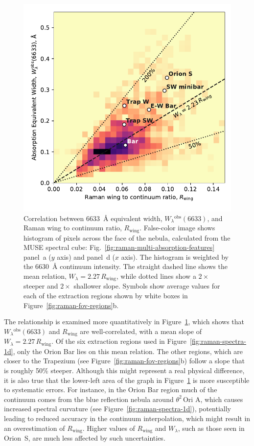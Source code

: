 \documentclass[useAMS, usenatbib, a4paper]{mnras}
\def\th#1#2{\ensuremath{\theta^{#1}\,\text{Ori~#2}}}
\newcommand\wing{\ensuremath{_{\text{wing}}}}
\newcommand\observed{\ensuremath{^{\text{obs}}}}
\begin{document}
\begin{figure}
  \centering
  \includegraphics[width=\linewidth]{figs/correlation-6633-Rwing}
  \caption{
    Correlation between \SI{6633}{\angstrom} equivalent width,
    \(W_\lambda\observed(6633)\), and Raman wing to continuum ratio, \(R\wing\).
    False-color image shows histogram of pixels across the face of the nebula,
    calculated from the MUSE spectral cube: 
    Fig.~\ref{fig:raman-multi-absorption-features} panel~a (\(y\) axis)
    and panel~d (\(x\) axis).
    The histogram is  weighted by the \SI{6630}{\angstrom}
    continuum intensity.
    The straight dashed line shows the mean relation,
    \(W_\lambda = 2.27\, R\wing\),
    while dotted lines show a \(2 \times\) steeper and \(2 \times\) shallower slope.
    Symbols show average values for each of the extraction regions
    shown by white boxes in Figure~\ref{fig:raman-fov-regions}b.
  }
  \label{fig:6633-Rwing}
\end{figure}

The relationship is examined more quantitatively in Figure~\ref{fig:6633-Rwing},
which shows that \(W_\lambda\observed (6633)\) and \(R\wing\) are well-correlated,
with a mean slope of \(W_\lambda = 2.27\, R\wing\).
Of the six extraction regions used in Figure~\ref{fig:raman-spectra-1d},
only the Orion Bar lies on this mean relation.
The other regions, which are closer to the Trapezium
(see Figure~\ref{fig:raman-fov-regions}b)
follow a slope that is roughly 50\% steeper.
Although this might represent a real physical difference,
it is also true that the lower-left area of the graph in Figure~\ref{fig:6633-Rwing}
is more susceptible to systematic errors.
For instance, in the Orion Bar region much of the continuum comes from
the blue reflection nebula around \th2A, which causes increased spectral curvature
(see Figure~\ref{fig:raman-spectra-1d}),
potentially leading to reduced accuracy in the continuum interpolation,
which might result in an overestimation of \(R\wing\).
Higher values of \(R\wing\) and \(W_\lambda\), such as those seen in Orion~S,
are much less affected by such uncertainties.
\end{document}
